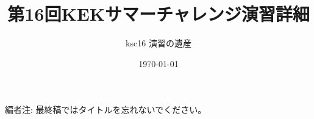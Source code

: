 \documentclass[dvipdfmx]{jsarticle}
\begin{document}
\title{第16回KEKサマーチャレンジ演習詳細}
\author{ksc16 演習の遺産}
\date{\today}
\begin{titlepage}
    \maketitle
    \thispagestyle{empty}
\end{titlepage}


\pagebreak

編者注: 最終稿ではタイトルを忘れないでください。

\pagebreak



\end{document}
